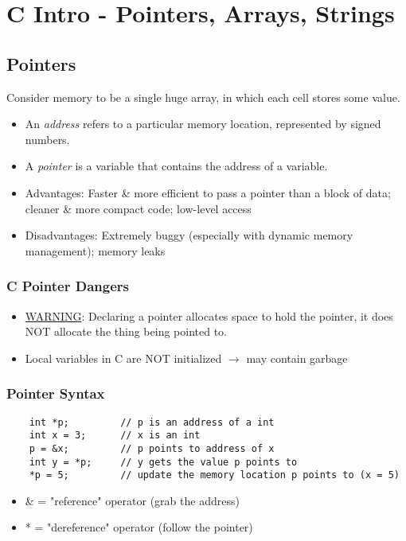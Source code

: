 \chapter{C Intro - Pointers, Arrays, Strings}

\section{Pointers}
Consider memory to be a single huge array, in which each cell stores some value.

\begin{itemize}
    \item An \emph{address} refers to a particular memory location, represented by signed numbers.
    \item A \emph{pointer} is a variable that contains the address of a variable.
    \item Advantages: Faster \& more efficient to pass a pointer than a block of data; cleaner \& more compact code; low-level access
    \item Disadvantages: Extremely buggy (especially with dynamic memory management); memory leaks
\end{itemize}

\subsection{C Pointer Dangers}
\begin{itemize}
    \item \underline{WARNING}: Declaring a pointer allocates space to hold the pointer, it does NOT allocate the thing being pointed to.
    \item Local variables in C are NOT initialized \(\rightarrow\) may contain garbage
\end{itemize}

\subsection{Pointer Syntax}
\begin{verbatim}
    int *p;         // p is an address of a int
    int x = 3;      // x is an int
    p = &x;         // p points to address of x
    int y = *p;     // y gets the value p points to
    *p = 5;         // update the memory location p points to (x = 5)
\end{verbatim}
\begin{itemize}
    \item \& = "reference" operator (grab the address)
    \item * = "dereference" operator (follow the pointer)
\end{itemize}

